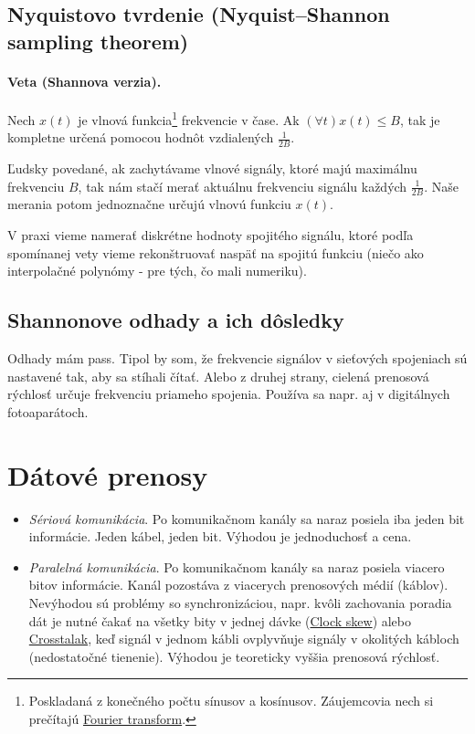 \documentclass[10pt,a4paper]{article}
\begin{document}
\subsection{Nyquistovo tvrdenie (Nyquist–Shannon sampling theorem)}             

\paragraph{Veta (Shannova verzia).} Nech $x(t)$ je vlnová funkcia\footnote{
Poskladaná z konečného počtu sínusov a kosínusov. Záujemcovia nech si prečítajú \href{http://en.wikipedia.org/wiki/Fourier_transform}{Fourier transform}.
} frekvencie v čase. Ak $(\forall t)x(t)\leq B$, tak je kompletne určená pomocou hodnôt vzdialených $\frac{1}{2B}$.

Ľudsky povedané, ak zachytávame vlnové signály, ktoré majú maximálnu frekvenciu $B$, tak nám stačí merať aktuálnu frekvenciu signálu každých $\frac{1}{2B}$. Naše merania potom jednoznačne určujú vlnovú funkciu $x(t)$.

V praxi vieme namerať diskrétne hodnoty spojitého signálu, ktoré podľa spomínanej vety vieme rekonštruovať naspäť na spojitú funkciu (niečo ako interpolačné polynómy - pre tých, čo mali numeriku). 
  
\subsection{Shannonove odhady a ich dôsledky}  
Odhady mám pass. 
Tipol by som, že frekvencie signálov v sieťových spojeniach sú nastavené tak, aby sa stíhali čítať. Alebo z druhej strany, cielená prenosová rýchlosť určuje frekvenciu priameho spojenia. 
Používa sa napr. aj v digitálnych fotoaparátoch. 


\section{Dátové prenosy}     
\begin{itemize}
\item \emph{Sériová komunikácia}. Po komunikačnom kanály sa naraz posiela iba jeden bit informácie. Jeden kábel, jeden bit. Výhodou je jednoduchosť a cena. 
\item \emph{Paralelná komunikácia}. 
Po komunikačnom kanály sa naraz posiela viacero bitov informácie. 
Kanál pozostáva z viacerych prenosových médií (káblov). 
Nevýhodou sú problémy so synchronizáciou, napr. kvôli zachovania poradia dát je nutné čakať na všetky bity v jednej dávke (\href{http://en.wikipedia.org/wiki/Clock_skew}{Clock skew}) 
alebo \href{http://en.wikipedia.org/wiki/Crosstalk}{Crosstalak}, keď signál v jednom kábli ovplyvňuje signály v okolitých kábloch (nedostatočné tienenie). 
Výhodou je teoreticky vyššia prenosová rýchlosť. 
\end{itemize}
\end{document}
